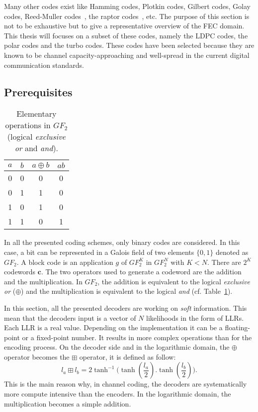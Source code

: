 Many other codes exist like Hamming codes, Plotkin codes, Gilbert codes, Golay
codes, Reed-Muller codes~\cite{Muller1954,Reed1954}, the raptor
codes~\cite{Shokrollahi2004}, etc. The purpose of this section is not to be
exhaustive but to give a representative overview of the FEC domain. This thesis
will focuses on a subset of these codes, namely the LDPC codes, the polar codes
and the turbo codes. These codes have been selected because they are known to
be channel capacity-approaching and well-spread in the current digital
communication standards.

\subsection{Prerequisites}

\begin{table}[htp]
  \centering
  \caption{Elementary operations in $GF_2$ (logical \emph{exclusive or} and
    \emph{and}).}
  \label{tab:ctx_gf2_operations}
   \begin{tabular}{c c c c}
   $a$ & $b$ & $a \oplus b$ & $ab$ \\
    \hline
    \hline
    0 & 0 & 0 & 0 \\
    0 & 1 & 1 & 0 \\
    1 & 0 & 1 & 0 \\
    1 & 1 & 0 & 1 \\
  \end{tabular}
\end{table}

In all the presented coding schemes, only binary codes are considered. In this
case, a bit can be represented in a Galois field of two elements $\{0, 1\}$
denoted as $GF_2$. A block code is an application $g$ of $GF_2^K$ in $GF_2^N$
with $K < N$. There are $2^K$ codewords $\bm{c}$. The two operators used to
generate a codeword are the addition and the multiplication. In $GF_2$, the
addition is equivalent to the logical \emph{exclusive or} ($\oplus$) and
the multiplication is equivalent to the logical \emph{and} (cf.
Table~\ref{tab:ctx_gf2_operations}).

In this section, all the presented decoders are working on \emph{soft}
information. This mean that the decoders input is a vector of $N$ likelihoods in
the form of LLRs. Each LLR is a real value. Depending on the implementation it
can be a floating-point or a fixed-point number. It results in more complex
operations than for the encoding process. On the decoder side and in the
logarithmic domain, the $\oplus$ operator becomes the $\boxplus$ operator, it is
defined as follow:
\begin{equation}
  l_a \boxplus l_b = 2\tanh^{-1}{\big(\tanh{(\frac{l_a}{2}).\tanh{(\frac{l_b}{2})}}\big)}.
\end{equation}
This is the main reason why, in channel coding, the decoders are systematically
more compute intensive than the encoders. In the logarithmic domain, the
multiplication becomes a simple addition.

